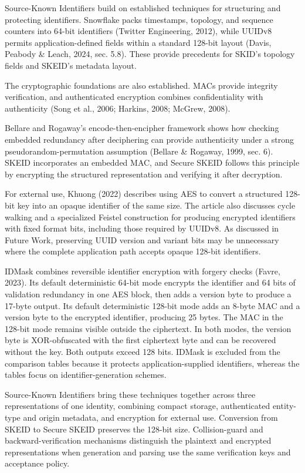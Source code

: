 \documentclass[fleqn,10pt,lineno]{wlpeerj}
\begin{document}
Source-Known Identifiers build on established techniques for structuring
and protecting identifiers. Snowflake packs timestamps, topology, and
sequence counters into 64-bit identifiers (Twitter Engineering, 2012),
while UUIDv8 permits application-defined fields within a standard
128-bit layout (Davis, Peabody \& Leach, 2024, sec. 5.8). These provide
precedents for SKID's topology fields and SKEID's metadata layout.

The cryptographic foundations are also established. MACs provide
integrity verification, and authenticated encryption combines
confidentiality with authenticity (Song et al., 2006; Harkins, 2008;
McGrew, 2008).

Bellare and Rogaway's encode-then-encipher framework shows how checking
embedded redundancy after deciphering can provide authenticity under a
strong pseudorandom-permutation assumption (Bellare \& Rogaway, 1999,
sec. 6). SKEID incorporates an embedded MAC, and Secure SKEID follows
this principle by encrypting the structured representation and verifying
it after decryption.

For external use, Khuong (2022) describes using AES to convert a
structured 128-bit key into an opaque identifier of the same size. The
article also discusses cycle walking and a specialized Feistel
construction for producing encrypted identifiers with fixed format bits,
including those required by UUIDv8. As discussed in Future Work,
preserving UUID version and variant bits may be unnecessary where the
complete application path accepts opaque 128-bit identifiers.

IDMask combines reversible identifier encryption with forgery checks
(Favre, 2023). Its default deterministic 64-bit mode encrypts the
identifier and 64 bits of validation redundancy in one AES block, then
adds a version byte to produce a 17-byte output. Its default
deterministic 128-bit mode adds an 8-byte MAC and a version byte to the
encrypted identifier, producing 25 bytes. The MAC in the 128-bit mode
remains visible outside the ciphertext. In both modes, the version byte
is XOR-obfuscated with the first ciphertext byte and can be recovered
without the key. Both outputs exceed 128 bits. IDMask is excluded from
the comparison tables because it protects application-supplied
identifiers, whereas the tables focus on identifier-generation schemes.

Source-Known Identifiers bring these techniques together across three
representations of one identity, combining compact storage,
authenticated entity-type and origin metadata, and encryption for
external use. Conversion from SKEID to Secure SKEID preserves the
128-bit size. Collision-guard and backward-verification mechanisms
distinguish the plaintext and encrypted representations when generation
and parsing use the same verification keys and acceptance policy.
\end{document}
